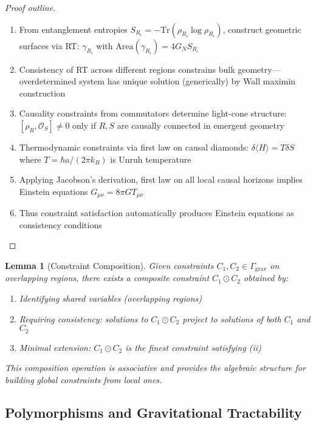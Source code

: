 \documentclass[11pt,a4paper]{article}
\newtheorem{lemma}[theorem]{Lemma}
\theoremstyle{remark}
\theoremstyle{definition}
\begin{document}
\begin{proof}[Proof outline]
\begin{enumerate}
\item From entanglement entropies $S_{R_i} = -\text{Tr}(\rho_{R_i} \log \rho_{R_i})$, construct geometric surfaces via RT: $\gamma_{R_i}$ with $\text{Area}(\gamma_{R_i}) = 4G_N S_{R_i}$
\item Consistency of RT across different regions constrains bulk geometry—overdetermined system has unique solution (generically) by Wall maximin construction
\item Causality constraints from commutators determine light-cone structure: $[\rho_R, \mathcal{O}_S] \neq 0$ only if $R, S$ are causally connected in emergent geometry
\item Thermodynamic constraints via first law on causal diamonds: $\delta \langle H \rangle = T \delta S$ where $T = \hbar a/(2\pi k_B)$ is Unruh temperature
\item Applying Jacobson's derivation, first law on all local causal horizons implies Einstein equations $G_{\mu\nu} = 8\pi G T_{\mu\nu}$
\item Thus constraint satisfaction automatically produces Einstein equations as consistency conditions
\end{enumerate}
\end{proof}

\begin{lemma}[Constraint Composition]
Given constraints $C_1, C_2 \in \Gamma_{\text{grav}}$ on overlapping regions, there exists a composite constraint $C_1 \odot C_2$ obtained by:
\begin{enumerate}[label=(\roman*)]
\item Identifying shared variables (overlapping regions)
\item Requiring consistency: solutions to $C_1 \odot C_2$ project to solutions of both $C_1$ and $C_2$
\item Minimal extension: $C_1 \odot C_2$ is the finest constraint satisfying (ii)
\end{enumerate}
This composition operation is associative and provides the algebraic structure for building global constraints from local ones.
\end{lemma}

\subsection{Polymorphisms and Gravitational Tractability}
\end{document}
